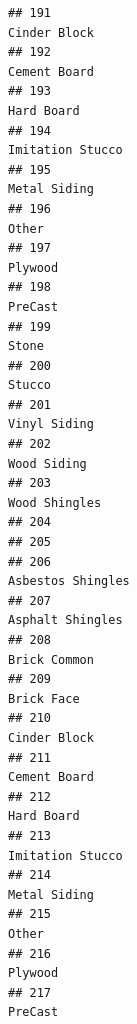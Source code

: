 \documentclass[
]{article}
\begin{document}
\begin{verbatim}
## 191                                                                               Cinder Block
## 192                                                                               Cement Board
## 193                                                                                 Hard Board
## 194                                                                           Imitation Stucco
## 195                                                                               Metal Siding
## 196                                                                                      Other
## 197                                                                                    Plywood
## 198                                                                                    PreCast
## 199                                                                                      Stone
## 200                                                                                     Stucco
## 201                                                                               Vinyl Siding
## 202                                                                                Wood Siding
## 203                                                                              Wood Shingles
## 204                                                                                           
## 205                                                                                           
## 206                                                                          Asbestos Shingles
## 207                                                                           Asphalt Shingles
## 208                                                                               Brick Common
## 209                                                                                 Brick Face
## 210                                                                               Cinder Block
## 211                                                                               Cement Board
## 212                                                                                 Hard Board
## 213                                                                           Imitation Stucco
## 214                                                                               Metal Siding
## 215                                                                                      Other
## 216                                                                                    Plywood
## 217                                                                                    PreCast

\end{verbatim}
\end{document}
